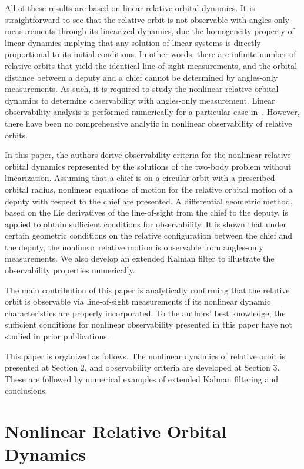 \documentclass[12pt,letterpaper]{ISSFD_v01}
\begin{document}
All of these results are based on linear relative orbital dynamics. It is straightforward to see that the relative orbit is not observable with angles-only measurements through its linearized dynamics, due the homogeneity property of linear dynamics implying that any solution of linear systems is directly proportional to its initial conditions. In other words, there are infinite number of relative orbits that yield the identical line-of-sight measurements, and the orbital distance between a deputy and a chief cannot be determined by angles-only measurements. As such, it is required to study the nonlinear relative orbital dynamics to determine observability with angles-only measurement. Linear observability analysis is performed numerically for a particular case in~\cite{YimCraPASMM04}. However, there have been no comprehensive analytic in nonlinear observability of relative orbits.

In this paper, the authors derive observability criteria for the nonlinear relative orbital dynamics represented by the solutions of the two-body problem without linearization.  Assuming that a chief is on a circular orbit with a prescribed orbital radius, nonlinear equations of motion for the relative orbital motion of a deputy with respect to the chief are presented.  A differential geometric method, based on the Lie derivatives of the line-of-sight from the chief to the deputy, is applied to obtain sufficient conditions for observability.  It is shown that under certain geometric conditions on the relative configuration between the chief and the deputy, the nonlinear relative motion is observable from angles-only measurements.  We also develop an extended Kalman filter to illustrate the observability properties numerically.

The main contribution of this paper is analytically confirming that the relative orbit is observable via line-of-sight measurements if its nonlinear dynamic characteristics are properly incorporated. To the authors' best knowledge, the sufficient conditions for nonlinear observability presented in this paper have not studied in prior publications. 

This paper is organized as follows. The nonlinear dynamics of relative orbit is presented at Section 2, and observability criteria are developed at Section 3. These are followed by numerical examples of extended Kalman filtering and conclusions. 

\section{Nonlinear Relative Orbital Dynamics}\label{sec:ND}
\end{document}
